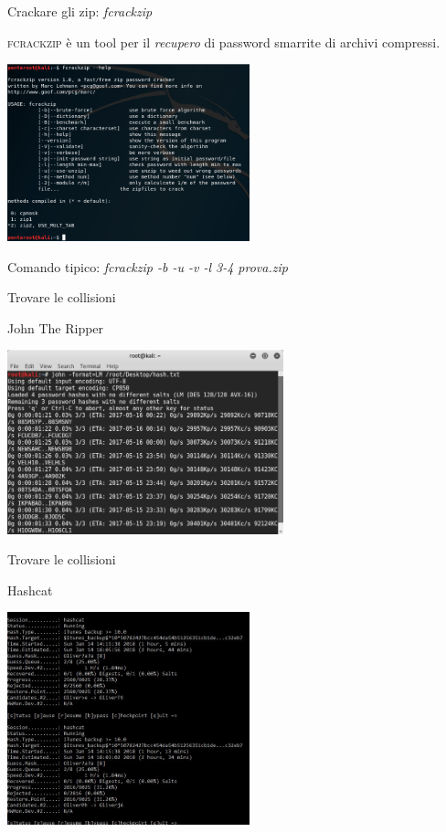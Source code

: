 \documentclass[handout, xcolor=dvipsnames,aspectratio=169]{beamer}
\begin{document}
\begin{frame}{Crackare gli zip: \textit{fcrackzip}}

\textsc{fcrackzip} è un tool per il \textit{recupero} di password smarrite di archivi compressi.

\smallskip

\centering

\includegraphics[width=7cm]{img/fcrackzip}

Comando tipico: \textit{fcrackzip -b -u -v -l 3-4 prova.zip}    

\end{frame}

\begin{frame}{Trovare le collisioni}

    John The Ripper
    
    \medskip
    
    \centering\includegraphics[width=8cm]{img/john}
    
\end{frame}
    
\begin{frame}{Trovare le collisioni}

    Hashcat
    
    \medskip
    
    \centering\includegraphics[width=7cm]{img/hashcat}
    
\end{frame}
    
\end{document}
